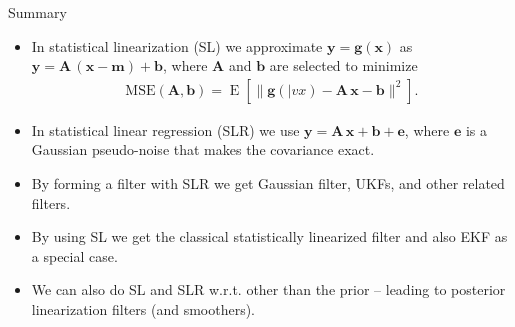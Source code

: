 \documentclass[first=dgreen,second=purple,presentation]{elecslides}
\newcommand{\mbf}[1]{\mathbf{#1}}
\DeclareMathOperator{\E}{E}
\newcommand{\vb}{\mbf{b}}
\newcommand{\ve}{\mbf{e}}
\newcommand{\vg}{\mbf{g}}
\newcommand{\vm}{\mbf{m}}
\newcommand{\vx}{\mbf{x}}
\newcommand{\vy}{\mbf{y}}
\newcommand{\MA}{\mbf{A}}
\begin{document}
\begin{frame}{Summary}
\begin{itemize}[<+->]
\item In \alert{statistical linearization (SL)} we approximate $\vy = \vg(\vx)$ as $\vy = \MA \, (\vx - \vm) + \vb$, where $\MA$ and $\vb$ are selected to minimize
%
\begin{equation}
\begin{split}
  \mathrm{MSE}(\MA,\vb) = \E\left[ \| \vg(|vx) - \MA \, \vx - \vb \|^2 \right].
\end{split}
\nonumber
\end{equation}

\item In \alert{statistical linear regression (SLR)} we use $\vy = \MA \, \vx + \vb + \ve$, where $\ve$ is a Gaussian pseudo-noise that makes the covariance exact.

\item  By forming a filter with SLR we get \alert{Gaussian filter, UKFs, and other related filters}.

\item By using SL we get the classical \alert{statistically linearized filter} and also \alert{EKF} as a special case.

\item We can also do SL and SLR w.r.t. \alert{other than the prior} -- leading to posterior linearization filters (and smoothers).
\end{itemize}
\end{frame}


\end{document}
